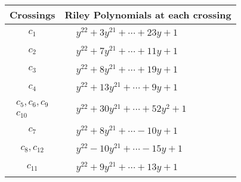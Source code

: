 \documentclass[1p]{elsarticle_modified}
\theoremstyle{definition}
\begin{document}
\begin{tabular}{m{50pt}|m{274pt}}
Crossings & \hspace{64pt}Riley Polynomials at each crossing \\
\hline $$\begin{aligned}c_{1}\end{aligned}$$&$\begin{aligned}
&y^{22}+3 y^{21}+\cdots+23 y+1
\end{aligned}$\\
\hline $$\begin{aligned}c_{2}\end{aligned}$$&$\begin{aligned}
&y^{22}+7 y^{21}+\cdots+11 y+1
\end{aligned}$\\
\hline $$\begin{aligned}c_{3}\end{aligned}$$&$\begin{aligned}
&y^{22}+8 y^{21}+\cdots+19 y+1
\end{aligned}$\\
\hline $$\begin{aligned}c_{4}\end{aligned}$$&$\begin{aligned}
&y^{22}+13 y^{21}+\cdots+9 y+1
\end{aligned}$\\
\hline $$\begin{aligned}c_{5},c_{6},c_{9}\\c_{10}\end{aligned}$$&$\begin{aligned}
&y^{22}+30 y^{21}+\cdots+52 y^2+1
\end{aligned}$\\
\hline $$\begin{aligned}c_{7}\end{aligned}$$&$\begin{aligned}
&y^{22}+8 y^{21}+\cdots-10 y+1
\end{aligned}$\\
\hline $$\begin{aligned}c_{8},c_{12}\end{aligned}$$&$\begin{aligned}
&y^{22}-10 y^{21}+\cdots-15 y+1
\end{aligned}$\\
\hline $$\begin{aligned}c_{11}\end{aligned}$$&$\begin{aligned}
&y^{22}+9 y^{21}+\cdots+13 y+1
\end{aligned}$\\
\hline
\end{tabular}\\~\\
\end{document}
